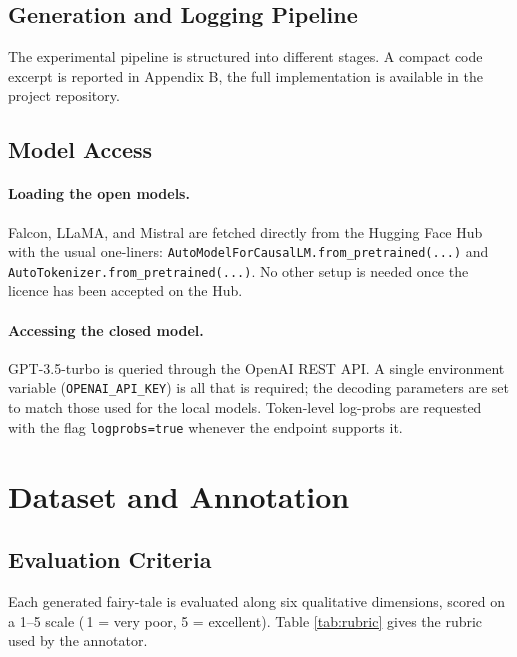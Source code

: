 \documentclass[12pt]{article}
\begin{document}
\subsection{Generation and Logging Pipeline}
The experimental pipeline is structured into different stages. A compact code excerpt is reported in Appendix B, the full implementation is available in the project repository.

\subsection{Model Access}
\paragraph{Loading the open models.}
Falcon, LLaMA, and Mistral are fetched directly from the Hugging Face Hub with the usual one-liners:
\verb|AutoModelForCausalLM.from_pretrained(...)| and
\verb|AutoTokenizer.from_pretrained(...)|.
No other setup is needed once the licence has been accepted on the Hub.

\paragraph{Accessing the closed model.}
GPT-3.5-turbo is queried through the OpenAI REST API.  
A single environment variable (\verb|OPENAI_API_KEY|) is all that is required; the decoding parameters are set to match those used for the local models.  
Token-level log-probs are requested with the flag \verb|logprobs=true| whenever the endpoint supports it.


\newpage
\section{Dataset and Annotation}

\subsection{Evaluation Criteria}
Each generated fairy-tale is evaluated along six qualitative dimensions,
scored on a 1–5 scale
(\,1 = very poor, 5 = excellent).  
Table \ref{tab:rubric} gives the rubric used by the annotator.
\end{document}
